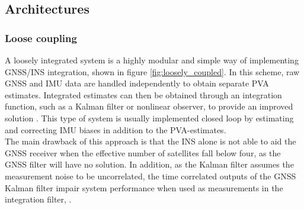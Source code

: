 

\subsection{Architectures}
    \subsubsection{Loose coupling}
    A loosely integrated system is a highly modular and simple way of implementing GNSS/INS integration, shown in figure \ref{fig:loosely_coupled}. In this scheme, raw GNSS and IMU data are handled independently to obtain separate PVA estimates. Integrated estimates can then be obtained through an integration function, such as a Kalman filter or nonlinear observer, to provide an improved solution \cite{book:Noureldin}. This type of system is usually implemented closed loop by estimating and correcting IMU biases in addition to the PVA-estimates.\\
    
    The main drawback of this approach is that the INS alone is not able to aid the GNSS receiver when the effective number of satellites fall below four, as the GNSS filter will have no solution. In addition, as the Kalman filter assumes the measurement noise to be uncorrelated, the time correlated outputs of the GNSS Kalman filter impair system performance when used as measurements in the integration filter, \cite{groves2013principles}.
    
